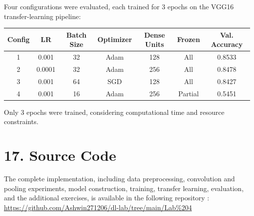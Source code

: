 \documentclass[11pt]{article}
\begin{document}
\vspace{3mm}

Four configurations were evaluated, each trained for 3 epochs on the VGG16 transfer-learning pipeline:

\begin{center}

\begin{tabular}{|c|c|c|c|c|c|c|}

\hline

Config & LR & Batch Size & Optimizer & Dense Units & Frozen & Val. Accuracy\\

\hline

1 & 0.001 & 32 & Adam & 128 & All & 0.8533\\

\hline

2 & 0.0001 & 32 & Adam & 256 & All & 0.8478\\

\hline

3 & 0.001 & 64 & SGD & 128 & All & 0.8427\\

\hline

4 & 0.001 & 16 & Adam & 256 & Partial & 0.5451\\

\hline

\end{tabular}

\end{center}

\vspace{3mm}
Only 3 epochs were trained, considering computational time and resource constraints.


\section*{17. Source Code}

The complete implementation, including data preprocessing, convolution and pooling experiments, model construction, training, transfer learning, evaluation, and the additional exercises, is available in the following repository :\\

    \hspace{25mm}  \url{https://github.com/Ashwin271206/dl-lab/tree/main/Lab%204}\\
\end{document}
